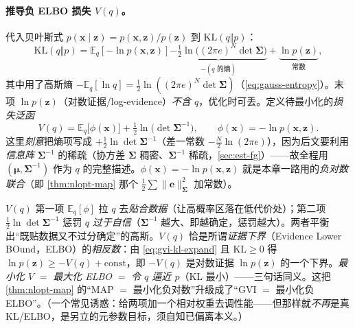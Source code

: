 \paragraph{推导负 ELBO 损失 $V(q)$。}
代入贝叶斯式 $p(\mathbf{x}\mid\mathbf{z})=p(\mathbf{x},\mathbf{z})/p(\mathbf{z})$ 到 $\mathrm{KL}(q\Vert p)$：
\begin{equation}
  \mathrm{KL}(q\Vert p)=\mathbb{E}_q[-\ln p(\mathbf{x},\mathbf{z})]
  \underbrace{-\tfrac12\ln\!\big((2\pi e)^N\det\boldsymbol{\Sigma}\big)}_{-(\text{$q$ 的熵})}
  +\underbrace{\ln p(\mathbf{z})}_{\text{常数}},
  \label{eq:gvi-kl-expand}
\end{equation}
其中用了高斯熵 $-\mathbb{E}_q[\ln q]=\tfrac12\ln((2\pi e)^N\det\boldsymbol{\Sigma})$（\cref{eq:gauss-entropy}）。末项 $\ln p(\mathbf{z})$（对数证据/log-evidence）\emph{不含 $q$}，优化时可丢。定义待最小化的\emph{损失泛函}
\begin{equation}
  \boxed{\ V(q)=\mathbb{E}_q\big[\phi(\mathbf{x})\big]+\tfrac12\ln\!\big(\det\boldsymbol{\Sigma}^{-1}\big),\qquad \phi(\mathbf{x})=-\ln p(\mathbf{x},\mathbf{z}).\ }
  \label{eq:gvi-V}
\end{equation}
这里\emph{刻意}把熵项写成 $+\tfrac12\ln\det\boldsymbol{\Sigma}^{-1}$（差一常数 $-\tfrac{N}{2}\ln(2\pi e)$），因为后文要利用\emph{信息阵} $\boldsymbol{\Sigma}^{-1}$ 的稀疏（协方差 $\boldsymbol{\Sigma}$ 稠密、$\boldsymbol{\Sigma}^{-1}$ 稀疏，\cref{sec:est-fg}）——故全程用 $(\boldsymbol{\mu},\boldsymbol{\Sigma}^{-1})$ 作为 $q$ 的完整描述。$\phi(\mathbf{x})=-\ln p(\mathbf{x},\mathbf{z})$ 就是本章一路用的\emph{负对数联合}（即 \cref{thm:nlopt-map} 那个 $\tfrac12\sum\|\mathbf{e}\|_{\boldsymbol{\Sigma}}^2$ 加常数）。

\begin{insight}
$V(q)$ 第一项 $\mathbb{E}_q[\phi]$ 拉 $q$ 去\emph{贴合数据}（让高概率区落在低代价处）；第二项 $\tfrac12\ln\det\boldsymbol{\Sigma}^{-1}$ 惩罚 $q$ \emph{过于自信}（$\boldsymbol{\Sigma}^{-1}$ 越大、即越确定，惩罚越大）。两者平衡出“既贴数据又不过分确定”的高斯。$V(q)$ 恰是所谓\emph{证据下界}（Evidence Lower BOund，ELBO）的\emph{相反数}：由 \cref{eq:gvi-kl-expand} 且 $\mathrm{KL}\ge0$ 得 $\ln p(\mathbf{z})\ge-V(q)+\text{const}$，即 $-V(q)$ 是对数证据 $\ln p(\mathbf{z})$ 的一个下界。\emph{最小化 $V$} $=$ \emph{最大化 ELBO} $=$ \emph{令 $q$ 逼近 $p$}（KL 最小）——三句话同义。这把 \cref{thm:nlopt-map} 的“MAP $=$ 最小化负对数”升级成了“GVI $=$ 最小化负 ELBO”。（一个常见诱惑：给两项加一个相对权重去调性能——但那样就\emph{不再}是真 KL/ELBO，是另立的元参数目标，须自知已偏离本义。）
\end{insight}

